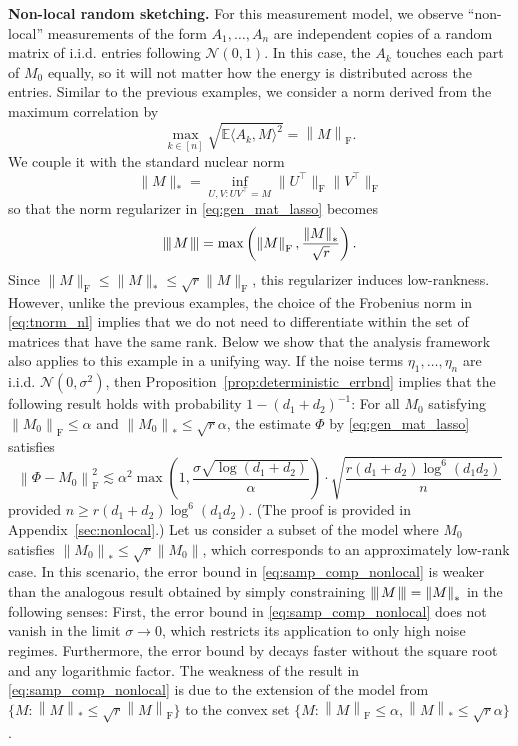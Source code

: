 \documentclass[11pt]{article}
\newcommand{\xspace}{\hbox{\kern-2.5pt}}
\newcommand\tnorm[1]{\left\vert\xspace\left\vert\xspace\left\vert\mskip2mu
#1\mskip2mu \right\vert\xspace\right\vert\xspace\right\vert}
\newcommand{\norm}[1]{\left \|#1 \right \|}
\newcommand{\E}{\mathbb{E}}
\begin{document}
\vspace{.1in}
\noindent
\textbf{Non-local random sketching.}  
For this measurement model, we observe ``non-local'' measurements of the form $A_1, \dots, A_n$ are independent copies of a random matrix of i.i.d. entries following $\mathcal{N}(0,1)$. 
In this case, the $A_k$ touches each part of $M_0$ equally, so it will not matter how the energy is distributed across the entries. 
Similar to the previous examples, we consider a norm derived from the maximum correlation by
\[
\max_{k \in [n]} \sqrt{\E \langle A_k, M \rangle^2} = \norm{M}_\mathrm{F}.
\]
We couple it with the standard nuclear norm 
\begin{equation}
\label{eq:nuc_norm_by_opt_factorization}
	\|M\|_* =  \inf_{U,V : U V^\top = M} \|U^\top\|_{\mathrm{F}} \|V^\top\|_{\mathrm{F}}
\end{equation}
so that the norm regularizer in \eqref{eq:gen_mat_lasso} becomes 
\begin{equation}
	\label{eq:tnorm_nl}
	\tnorm{M} = \max\left( \norm{M}_{\mathrm{F}}, \frac{\norm{M}_*}{\sqrt{r}} \right).
\end{equation}
Since $\|M\|_\mathrm{F} \leq \|M\|_* \leq \sqrt{r} \|M\|_\mathrm{F}$, this regularizer induces low-rankness. 
However, unlike the previous examples, the choice of the Frobenius norm in \eqref{eq:tnorm_nl} implies that we do not need to differentiate within the set of matrices that have the same rank.
Below we show that the analysis framework also applies to this example in a unifying way. 
If the noise terms $\eta_1,\dots,\eta_n$ are i.i.d. $\mathcal{N}(0,\sigma^2)$, then Proposition~\ref{prop:deterministic_errbnd} implies that the following result holds with probability $1-(d_1+d_2)^{-1}$: For all $M_0$ satisfying $\norm{M_0}_\mathrm{F} \leq \alpha$ and $\norm{M_0}_* \leq \sqrt{r} \alpha$, the estimate $\Phi$ by \eqref{eq:gen_mat_lasso} satisfies 
\begin{equation}
\label{eq:samp_comp_nonlocal}
\norm{\Phi-M_0}_\mathrm{F}^2 
\lesssim \alpha^2 \max\left(1, \frac{\sigma \sqrt{\log(d_1+d_2)}}{\alpha} \right) \cdot \sqrt{\frac{r(d_1+d_2)\log^6(d_1d_2)}{n}}
\end{equation}
provided $n \geq r(d_1+d_2) \log^6 (d_1d_2)$. (The proof is provided in Appendix~\ref{sec:nonlocal}.)
Let us consider a subset of the model where $M_0$ satisfies $\norm{M_0}_* \leq \sqrt{r} \norm{M_0}$, which corresponds to an approximately low-rank case. 
In this scenario, the error bound in \eqref{eq:samp_comp_nonlocal} is weaker than the analogous result obtained by simply constraining $\tnorm{M} = \norm{M}_*$ \citep[Eq. (II.7)]{candes2011tight} in the following senses: First, the error bound in \eqref{eq:samp_comp_nonlocal} does not vanish in the limit $\sigma \to 0$, which restricts its application to only high noise regimes. 
Furthermore, the error bound by \citet{candes2011tight} decays faster without the square root and any logarithmic factor.
The weakness of the result in \eqref{eq:samp_comp_nonlocal} is due to the extension of the model from $\{M: \norm{M}_* \leq \sqrt{r} \norm{M}_\mathrm{F}\}$ to the convex set $\{M: \norm{M}_\mathrm{F} \leq \alpha, \norm{M}_* \leq \sqrt{r}\alpha\}$. 
\end{document}
